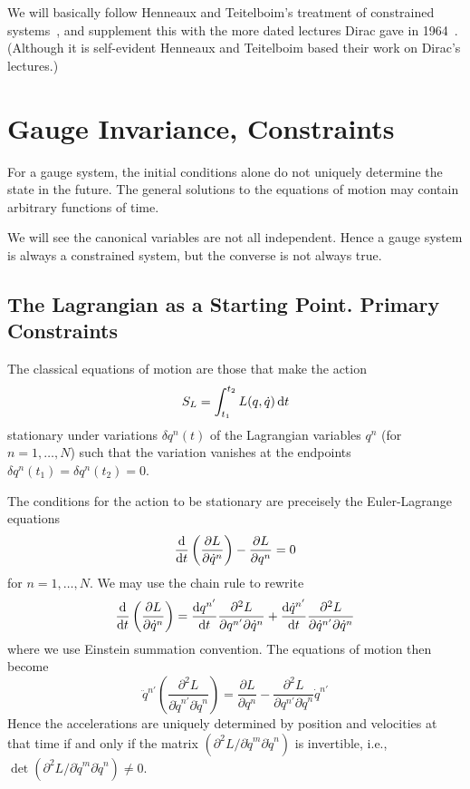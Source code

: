  We will basically follow Henneaux and Teitelboim's treatment
of constrained systems~\cite[ch 1]{Henneaux:1992ig}, and supplement this
with the more dated lectures Dirac gave in 1964~\cite[ch 1]{dirac1964}. 
(Although it is self-evident Henneaux and Teitelboim based their work on
Dirac's lectures.)

\section{Gauge Invariance, Constraints}
\M
For a gauge system, the initial conditions alone do not uniquely
determine the state in the future. The general solutions to the
equations of motion may contain arbitrary functions of time.

We will see the canonical variables are not all independent. Hence a
gauge system is always a constrained system, but the converse is not
always true.

\subsection{The Lagrangian as a Starting Point. Primary Constraints}
The classical equations of motion are those that make the action
\begin{equation}
  S_{L} = \int^{t_{2}}_{t_{1}} L(q,\dot{q})\,\mathrm{d} t
\end{equation}
stationary under variations $\delta q^{n}(t)$ of the Lagrangian
variables $q^n$ (for $n=1,\dots,N$) such that the variation vanishes at
the endpoints $\delta q^{n}(t_{1})=\delta q^{n}(t_{2})=0$.

The conditions for the action to be stationary are preceisely the
Euler-Lagrange equations
\begin{equation}
  \frac{\mathrm{d}}{\mathrm{d} t}\left(\frac{\partial L}{\partial\dot{q}^{n}}\right)
  -\frac{\partial L}{\partial q^{n}}=0
\end{equation}
for $n=1,\dots, N$. We may use the chain rule to rewrite
\begin{equation}
  \frac{\mathrm{d}}{\mathrm{d} t}\left(\frac{\partial L}{\partial\dot{q}^{n}}\right)
  =\frac{\mathrm{d} q^{n'}}{\mathrm{d} t}\frac{\partial^{2} L}{\partial q^{n'}\partial\dot{q}^{n}}
  +\frac{\mathrm{d}\dot{q}^{n'}}{\mathrm{d} t}\frac{\partial^{2} L}{\partial\dot{q}^{n'}\partial\dot{q}^{n}}
\end{equation}
where we use Einstein summation convention. The equations of motion then
become
\begin{equation}
  \ddot{q}^{n'}\left(\frac{\partial^{2}L}{\partial\dot{q}^{n'}\partial\dot{q}^{n}}\right)
  =\frac{\partial L}{\partial q^{n}}
  -\frac{\partial^{2}L}{\partial q^{n'}\partial\dot{q}^{n}}\dot{q}^{n'}
\end{equation}
Hence the accelerations are uniquely determined by position and
velocities at that time if and only if the matrix
$(\partial^{2}L/\partial\dot{q}^{m}\partial\dot{q}^{n})$ is invertible,
i.e., $\det(\partial^{2}L/\partial\dot{q}^{m}\partial\dot{q}^{n})\neq0$.

